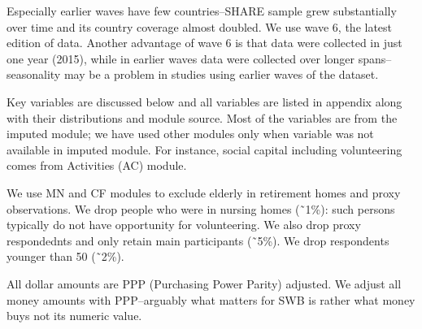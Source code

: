 \documentclass[10pt, letterpaper]{article}
\begin{document}
\begin{spacing}{1.4}
                                
Especially earlier waves have few countries--SHARE sample grew substantially
over time and its country coverage almost doubled.
We use  wave 6, the latest edition of data. Another advantage of wave 6 is that
data were collected in just one year (2015), %
while in earlier waves data were collected over longer spans--seasonality may be
a problem in studies using earlier waves of the dataset.

Key variables are discussed below and all variables are listed in appendix along
with their distributions and module source.
Most of the variables are from the imputed module; we have used other modules
only when variable was not available in imputed module. For instance, social capital including
volunteering comes from Activities (AC) module. 

 We use MN and CF modules to
exclude elderly in retirement homes and proxy observations.
%
We drop people who were in nursing homes (\~\ 1\%): such persons typically do
not have opportunity for volunteering. We also drop proxy respondednts and only retain
main participants (\~\ 5\%). %
 We drop respondents younger than 50 (\~\ 2\%). %


All dollar amounts are PPP (Purchasing Power Parity) adjusted. We adjust all money amounts with
PPP--arguably what matters for SWB is rather what money buys not its numeric value.


\end{spacing}
\end{document}
